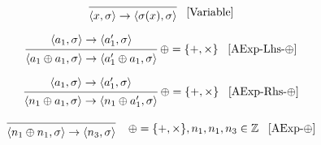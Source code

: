 \[
\begin{prooftree}
\infer0{
	\langle x, \sigma \rangle 
	\rightarrow  
	\langle \sigma(x), \sigma \rangle 
}
\end{prooftree} \; \; \; [\text{Variable}]
\]

\[
\begin{prooftree}
\hypo{
	\langle a_1, \sigma \rangle \rightarrow
	\langle a_1^\prime, \sigma \rangle 
} 
\infer1{
	\langle a_1 \oplus a_1, \sigma \rangle \rightarrow  
	\langle a_1^\prime \oplus a_1, \sigma \rangle
}
\end{prooftree} \; \oplus = \{+,\times\} \; \; \; [\text{AExp-Lhs-}\oplus]
\]

\[
\begin{prooftree}
\hypo{
	\langle a_1, \sigma \rangle \rightarrow
	\langle a_1^\prime, \sigma \rangle 
} 
\infer1{
	\langle n_1 \oplus a_1, \sigma \rangle \rightarrow  
	\langle n_1 \oplus a_1^\prime, \sigma \rangle
}
\end{prooftree} \; \oplus = \{+,\times\} \; \; \; [\text{AExp-Rhs-}\oplus]
\]

\[
\begin{prooftree}
\infer0{
	\langle n_1 \oplus n_1, \sigma \rangle \rightarrow  
	\langle n_3,  \sigma \rangle
}
\end{prooftree} \; \; \; \; \oplus = \{+,\times\}, n_1, n_1, n_3 \in \mathbb{Z} \; \; \; [\text{AExp-}\oplus]
\]


